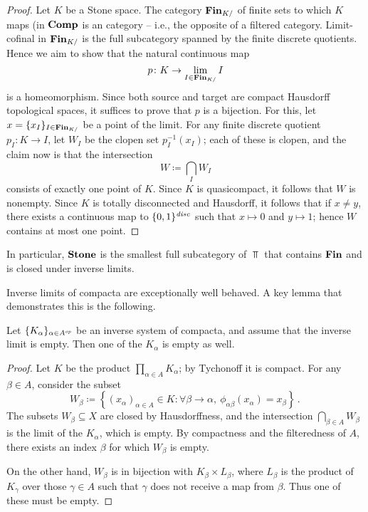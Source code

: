 \begin{proof}
	Let $ K $ be a Stone space.
	The category $ \textbf{\textup{Fin}}_{K/} $ of finite sets to which $ K $ maps (in $ \textbf{\textup{Comp}} $ is an  category -- i.e., the opposite of a filtered category.
	Limit-cofinal in $ \textbf{\textup{Fin}}_{K/} $ is the full subcategory spanned by the finite discrete quotients.
	Hence we aim to show that the natural continuous map
	\[
		p \colon K \to \lim_{I \in \textbf{\textup{Fin}}_{K/}} I
	\]
	is a homeomorphism.
	Since both source and target are compact Hausdorff topological spaces, it suffices to prove that $ p $ is a bijection.
	For this, let $ x = \{ x_I \}_{I \in \textbf{\textup{Fin}}_{K/}} $ be a point of the limit.
	For any finite discrete quotient $p_I \colon K \to I $, let $ W_I $ be the clopen set $ p_I^{-1}(x_I) $;
	each of these is clopen, and the claim now is that the intersection
	\[
		W \coloneq \bigcap_I W_I
	\]
	consists of exactly one point of $ K $.
	Since $ K $ is quasicompact, it follows that $ W $ is nonempty.
	Since $ K $ is totally disconnected and Hausdorff, it follows that if $ x \neq y $, there exists a continuous map to $\{ 0,1 \}^{\textit{disc}}$ such that $ x \mapsto 0 $ and $ y \mapsto 1 $;
	hence $ W $ contains at most one point.
\end{proof}

\begin{nul}
	In particular, $ \textbf{\textup{Stone}} $ is the smallest full subcategory of $ \Top $ that contains $ \textbf{\textup{Fin}} $ and is closed under inverse limits.
\end{nul}

Inverse limits of compacta are exceptionally well behaved.
A key lemma that demonstrates this is the following.

\begin{lem} \label{emptyinverselimitofcompacta}
	Let $ \{ K_{\alpha} \}_{\alpha \in A^{\textit{op}}} $ be an inverse system of compacta, and assume that the inverse limit is empty.
	Then one of the $ K_{\alpha} $ is empty as well.
\end{lem}

\begin{proof}
	Let $ K $ be the product $\prod_{\alpha \in A} K_{\alpha}$;
	by Tychonoff it is compact.
	For any $ \beta \in A $, consider the subset
	\[
		W_{\beta} \coloneq \left\{ (x_{\alpha})_{\alpha \in A} \in K : \forall \beta \to \alpha,\ \phi_{\alpha\beta} (x_{\alpha}) = x_{\beta} \right\} \period
	\]
	The subsets $W_{\beta} \subseteq X$ are closed by Hausdorffness, and the intersection $\bigcap_{\beta \in A} W_{\beta}$ is the limit of the $ K_{\alpha} $, which is empty.
	By compactness and the filteredness of $ A $, there exists an index $ \beta $ for which $ W_{\beta} $ is empty.

	On the other hand, $W_{\beta}$ is in bijection with $ K_{\beta} \times L_{\beta} $, where $ L_{\beta} $ is the product of $ K_{\gamma} $ over those $ \gamma \in A $ such that $ \gamma $ does not receive a map from $ \beta $.
	Thus one of these must be empty.
\end{proof}

